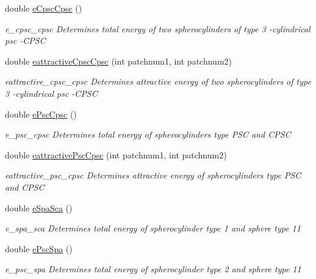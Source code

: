 \begin{DoxyCompactItemize}
double \hyperlink{class_pair_energy_calculator_a0638198e420892c829d4d236f4d50867}{e\+Cpsc\+Cpsc} ()
\begin{DoxyCompactList}\small\item\em e\+\_\+cpsc\+\_\+cpsc Determines total energy of two spherocylinders of type 3 -\/cylindrical psc -\/\+C\+P\+S\+C \end{DoxyCompactList}\item 
double \hyperlink{class_pair_energy_calculator_a50c513f53158864a0e5c40588c6bde9b}{eattractive\+Cpsc\+Cpsc} (int patchnum1, int patchnum2)
\begin{DoxyCompactList}\small\item\em eattractive\+\_\+cpsc\+\_\+cpsc Determines attractive energy of two spherocylinders of type 3 -\/cylindrical psc -\/\+C\+P\+S\+C \end{DoxyCompactList}\item 
double \hyperlink{class_pair_energy_calculator_a3d4e266cb7c1a937e273d86e52639ec0}{e\+Psc\+Cpsc} ()
\begin{DoxyCompactList}\small\item\em e\+\_\+psc\+\_\+cpsc Determines total energy of spherocylinders type P\+S\+C and C\+P\+S\+C \end{DoxyCompactList}\item 
double \hyperlink{class_pair_energy_calculator_ab499a61da3b4d47baa95d1acbdde4d36}{eattractive\+Psc\+Cpsc} (int patchnum1, int patchnum2)
\begin{DoxyCompactList}\small\item\em eattractive\+\_\+psc\+\_\+cpsc Determines attractive energy of spherocylinders type P\+S\+C and C\+P\+S\+C \end{DoxyCompactList}\item 
double \hyperlink{class_pair_energy_calculator_aa9d21f5803c4619a54f40f9ac2793cc4}{e\+Spa\+Sca} ()
\begin{DoxyCompactList}\small\item\em e\+\_\+spa\+\_\+sca Determines total energy of spherocylinder type 1 and sphere type 11 \end{DoxyCompactList}\item 
double \hyperlink{class_pair_energy_calculator_a8be1353d0788362c908e74f28d35dd0c}{e\+Psc\+Spa} ()
\begin{DoxyCompactList}\small\item\em e\+\_\+psc\+\_\+spa Determines total energy of spherocylinder type 2 and sphere type 11 \end{DoxyCompactList}\item 

\end{DoxyCompactItemize}
